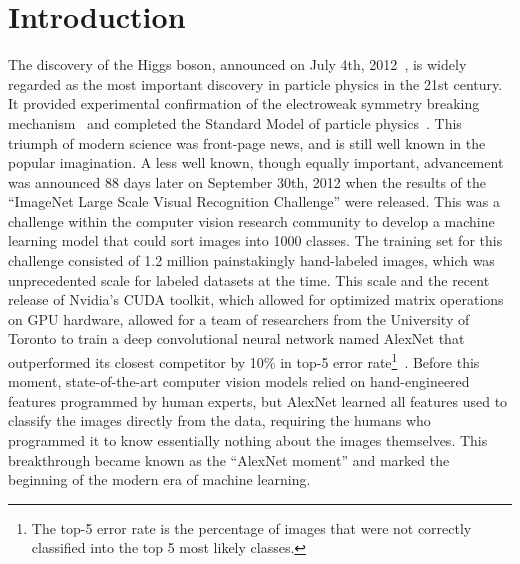 \chapter{Introduction}
\label{ch:intro}



The discovery of the Higgs boson, announced on July 4th, 2012~\cite{ATLAS:2012yve,CMS:2012qbp}, is widely regarded as the most important discovery in particle physics in the 21st century.
It provided experimental confirmation of the electroweak symmetry breaking mechanism~\cite{PhysRevLett.13.321, PhysRevLett.13.508, PhysRevLett.13.585} and completed the Standard Model of particle physics~\cite{PhysRevLett.19.1264, THOOFT1972189}.
This triumph of modern science was front-page news, and is still well known in the popular imagination.
A less well known, though equally important, advancement was announced 88 days later on September 30th, 2012 when the results of the ``ImageNet Large Scale Visual Recognition Challenge'' were released.
This was a challenge within the computer vision research community to develop a machine learning model that could sort images into 1000 classes.
The training set for this challenge consisted of 1.2 million painstakingly hand-labeled images, which was unprecedented scale for labeled datasets at the time.
This scale and the recent release of Nvidia's CUDA toolkit, which allowed for optimized matrix operations on GPU hardware, allowed for a team of researchers from the University of Toronto to train a deep convolutional neural network named AlexNet that outperformed its closest competitor by 10\% in top-5 error rate\footnote{The top-5 error rate is the percentage of images that were not correctly classified into the top 5 most likely classes.}~\cite{krizhevsky2012imagenet}.
Before this moment, state-of-the-art computer vision models relied on hand-engineered features programmed by human experts, but AlexNet learned all features used to classify the images directly from the data, requiring the humans who programmed it to know essentially nothing about the images themselves.
This breakthrough became known as the ``AlexNet moment'' and marked the beginning of the modern era of machine learning.

